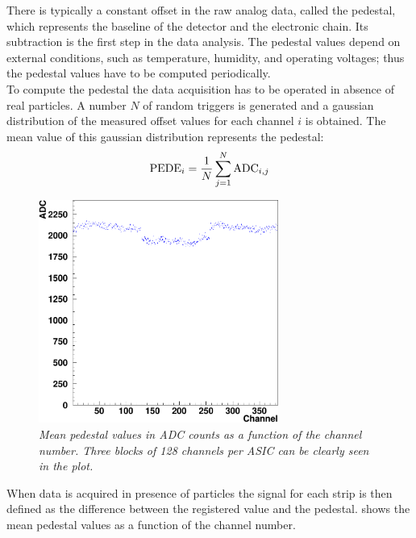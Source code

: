 There is typically a constant offset in the raw analog data, called the
pedestal, which represents the baseline of the detector and the electronic
chain. Its subtraction is the first step in the data analysis.
The pedestal values depend on external conditions, such as temperature,
humidity, and operating voltages; thus
the pedestal values have to be computed periodically.\\
To compute the pedestal the data acquisition has to be operated in absence of
real particles. A number $N$ of random triggers is generated and a gaussian
distribution of the measured offset values for each channel $i$ is obtained. The
mean value of this gaussian distribution represents the
pedestal: %
\begin{equation}\label{eq:pede}
{\rm PEDE}_i = \frac{1}{N}\sum_{j=1}^N {\rm ADC}_{i,j}
\end{equation}
\begin{figure}[!htbp]
\centering
\includegraphics[width=0.7\textwidth]{cap4/immagini/pede_profile-crop.pdf}%
  \caption{\it Mean pedestal values in ADC counts as a function of the channel
    number. Three blocks of 128 channels per ASIC can be clearly seen in the plot.}\label{fig:pede}
\end{figure}
When data is acquired in presence of particles the signal for each strip is then
defined as the difference between the registered value and the
pedestal.  shows the mean pedestal values as a function of the
channel number.


